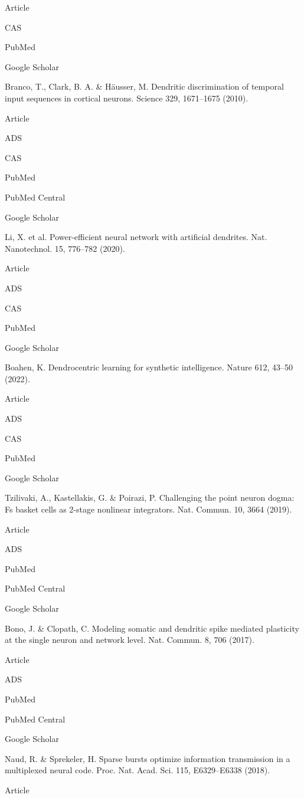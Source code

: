 Article
 
CAS
 
PubMed
 
Google Scholar
 

Branco, T., Clark, B. A. & Häusser, M. Dendritic discrimination of temporal input sequences in cortical neurons. Science 329, 1671–1675 (2010).

Article
 
ADS
 
CAS
 
PubMed
 
PubMed Central
 
Google Scholar
 

Li, X. et al. Power-efficient neural network with artificial dendrites. Nat. Nanotechnol. 15, 776–782 (2020).

Article
 
ADS
 
CAS
 
PubMed
 
Google Scholar
 

Boahen, K. Dendrocentric learning for synthetic intelligence. Nature 612, 43–50 (2022).

Article
 
ADS
 
CAS
 
PubMed
 
Google Scholar
 

Tzilivaki, A., Kastellakis, G. & Poirazi, P. Challenging the point neuron dogma: Fs basket cells as 2-stage nonlinear integrators. Nat. Commun. 10, 3664 (2019).

Article
 
ADS
 
PubMed
 
PubMed Central
 
Google Scholar
 

Bono, J. & Clopath, C. Modeling somatic and dendritic spike mediated plasticity at the single neuron and network level. Nat. Commun. 8, 706 (2017).

Article
 
ADS
 
PubMed
 
PubMed Central
 
Google Scholar
 

Naud, R. & Sprekeler, H. Sparse bursts optimize information transmission in a multiplexed neural code. Proc. Nat. Acad. Sci. 115, E6329–E6338 (2018).

Article
 
